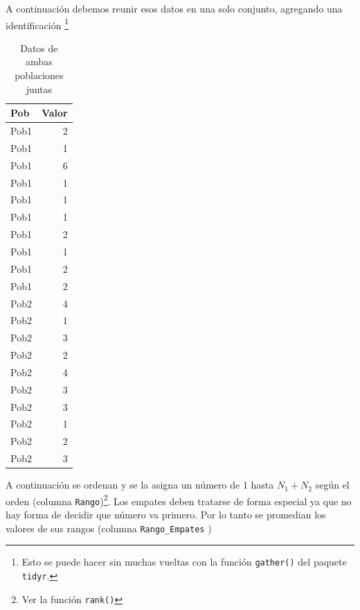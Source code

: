\documentclass[]{book}
\newenvironment{Shaded}{\begin{snugshade}}{\end{snugshade}}
\newcommand{\DataTypeTok}[1]{\textcolor[rgb]{0.13,0.29,0.53}{#1}}
\newcommand{\KeywordTok}[1]{\textcolor[rgb]{0.13,0.29,0.53}{\textbf{#1}}}
\newcommand{\NormalTok}[1]{#1}
\newcommand{\OperatorTok}[1]{\textcolor[rgb]{0.81,0.36,0.00}{\textbf{#1}}}
\newcommand{\StringTok}[1]{\textcolor[rgb]{0.31,0.60,0.02}{#1}}
\let\rmarkdownfootnote\footnote%
\def\footnote{\protect\rmarkdownfootnote}
\theoremstyle{definition}
\theoremstyle{definition}
\theoremstyle{definition}
\theoremstyle{remark}
\begin{document}
A continuación debemos reunir esos datos en una solo conjunto, agregando
una identificación \footnote{Esto se puede hacer sin muchas vueltas con
  la función \texttt{gather()} del paquete \texttt{tidyr}.}

\begin{table}

\caption{\label{tab:ejemplo-ranking-gather}Datos de ambas poblaciones juntas}
\centering
\begin{tabular}[t]{l|r}
\hline
Pob & Valor\\
\hline
Pob1 & 2\\
\hline
Pob1 & 1\\
\hline
Pob1 & 6\\
\hline
Pob1 & 1\\
\hline
Pob1 & 1\\
\hline
Pob1 & 1\\
\hline
Pob1 & 2\\
\hline
Pob1 & 1\\
\hline
Pob1 & 2\\
\hline
Pob1 & 2\\
\hline
Pob2 & 4\\
\hline
Pob2 & 1\\
\hline
Pob2 & 3\\
\hline
Pob2 & 2\\
\hline
Pob2 & 4\\
\hline
Pob2 & 3\\
\hline
Pob2 & 3\\
\hline
Pob2 & 1\\
\hline
Pob2 & 2\\
\hline
Pob2 & 3\\
\hline
\end{tabular}
\end{table}

A continuación se ordenan y se la asigna un número de 1 hasta
\(N_1+N_2\) según el orden (columna \texttt{Rango})\footnote{Ver la
  función \texttt{rank()}}. Los empates deben tratarse de forma especial
ya que no hay forma de decidir que número va primero. Por lo tanto se
promedian los valores de sus rangos (columna \texttt{Rango\_Empates} )

\begin{Shaded}
\end{Shaded}
\end{document}
